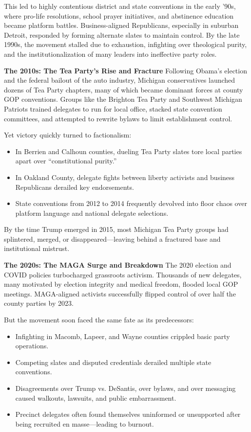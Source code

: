 This led to highly contentious district and state conventions in the early ’90s, where pro-life resolutions, school prayer initiatives, and abstinence education became platform battles. Business-aligned Republicans, especially in suburban Detroit, responded by forming alternate slates to maintain control. By the late 1990s, the movement stalled due to exhaustion, infighting over theological purity, and the institutionalization of many leaders into ineffective party roles.

\textbf{The 2010s: The Tea Party’s Rise and Fracture}
Following Obama’s election and the federal bailout of the auto industry, Michigan conservatives launched dozens of Tea Party chapters, many of which became dominant forces at county GOP conventions. Groups like the Brighton Tea Party and Southwest Michigan Patriots trained delegates to run for local office, stacked state convention committees, and attempted to rewrite bylaws to limit establishment control.

Yet victory quickly turned to factionalism:
\begin{itemize}
\item In Berrien and Calhoun counties, dueling Tea Party slates tore local parties apart over “constitutional purity.”
\item In Oakland County, delegate fights between liberty activists and business Republicans derailed key endorsements.
\item State conventions from 2012 to 2014 frequently devolved into floor chaos over platform language and national delegate selections.
\end{itemize}

By the time Trump emerged in 2015, most Michigan Tea Party groups had splintered, merged, or disappeared—leaving behind a fractured base and institutional mistrust.

\textbf{The 2020s: The MAGA Surge and Breakdown}
The 2020 election and COVID policies turbocharged grassroots activism. Thousands of new delegates, many motivated by election integrity and medical freedom, flooded local GOP meetings. MAGA-aligned activists successfully flipped control of over half the county parties by 2023.

But the movement soon faced the same fate as its predecessors:
\begin{itemize}
\item Infighting in Macomb, Lapeer, and Wayne counties crippled basic party operations.
\item Competing slates and disputed credentials derailed multiple state conventions.
\item Disagreements over Trump vs. DeSantis, over bylaws, and over messaging caused walkouts, lawsuits, and public embarrassment.
\item Precinct delegates often found themselves uninformed or unsupported after being recruited en masse—leading to burnout.
\end{itemize}

